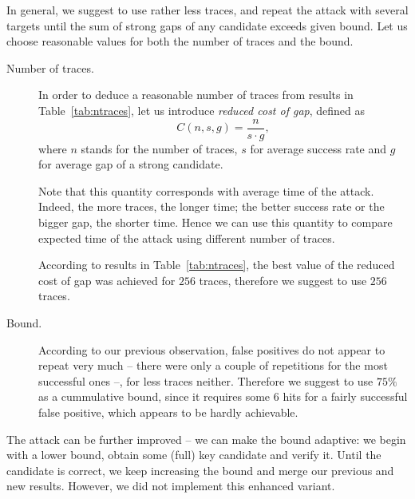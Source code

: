In general, we suggest to use rather less traces, and repeat the attack with several targets until the sum of strong gaps of any candidate exceeds given bound. Let us choose reasonable values for both the number of traces and the bound.
\begin{description}
	\item[Number of traces.]
		In order to deduce a reasonable number of traces from results in Table~\ref{tab:ntraces}, let us introduce {\em reduced cost of gap}, defined as
		\begin{equation*}
			C(n, s, g) = \frac{n}{s\cdot g} ,
		\end{equation*}
		where $n$ stands for the number of traces, $s$ for average success rate and $g$ for average gap of a strong candidate.
		
		Note that this quantity corresponds with average time of the attack. Indeed, the more traces, the longer time; the better success rate or the bigger gap, the shorter time. Hence we can use this quantity to compare expected time of the attack using different number of traces.
		
		According to results in Table~\ref{tab:ntraces}, the best value of the reduced cost of gap was achieved for $256$ traces, therefore we suggest to use $256$ traces.
	\item[Bound.]
		According to our previous observation, false positives do not appear to repeat very much -- there were only a couple of repetitions for the most successful ones --, for less traces neither. Therefore we suggest to use $75\%$ as a cummulative bound, since it requires some $6$ hits for a fairly successful false positive, which appears to be hardly achievable.
\end{description}

\begin{remark}
\label{rem:attimpr}
	The attack can be further improved -- we can make the bound adaptive: we begin with a lower bound, obtain some (full) key candidate and verify it. Until the candidate is correct, we keep increasing the bound and merge our previous and new results. However, we did not implement this enhanced variant.
\end{remark}

